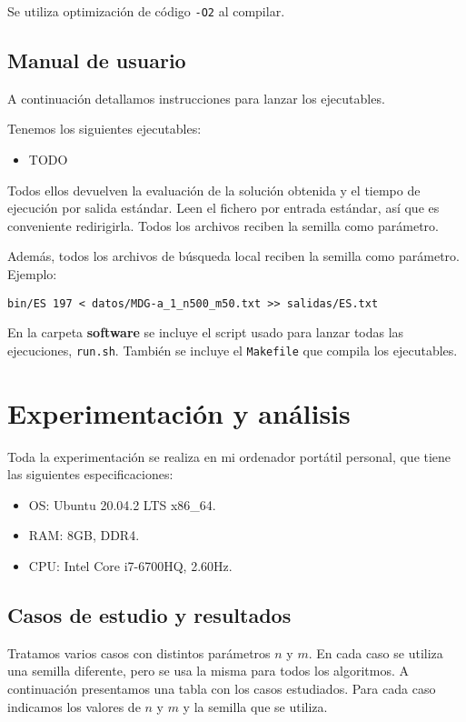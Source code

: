 \documentclass{article}
\begin{document}
Se utiliza optimización de código \texttt{-O2} al compilar.

\subsection{Manual de usuario}

A continuación detallamos instrucciones para lanzar los ejecutables.

Tenemos los siguientes ejecutables:

\begin{itemize}
\item TODO
\end{itemize}

Todos ellos devuelven la evaluación de la solución obtenida y el tiempo de ejecución por salida estándar.
Leen el fichero por entrada estándar, así que es conveniente redirigirla.
Todos los archivos reciben la semilla como parámetro.

Además, todos los archivos de búsqueda local reciben la semilla como parámetro. Ejemplo:
\begin{verbatim}
bin/ES 197 < datos/MDG-a_1_n500_m50.txt >> salidas/ES.txt
\end{verbatim}

En la carpeta \textbf{software} se incluye el script usado para lanzar todas las ejecuciones, \texttt{run.sh}. También se incluye
el \texttt{Makefile} que compila los ejecutables.

\pagebreak

\section{Experimentación y análisis}

Toda la experimentación se realiza en mi ordenador portátil personal, que tiene las siguientes especificaciones:
\begin{itemize}
	\item OS: Ubuntu 20.04.2 LTS x86\_64.
	\item RAM: 8GB, DDR4.
	\item CPU: Intel Core i7-6700HQ, 2.60Hz.
\end{itemize}

\subsection{Casos de estudio y resultados}

Tratamos varios casos con distintos parámetros $n$ y $m$. En cada caso se utiliza una semilla diferente, pero se usa la misma para todos los algoritmos.
A continuación presentamos una tabla con los casos estudiados. Para cada caso indicamos los valores de $n$ y $m$ y la semilla
que se utiliza.
\end{document}
